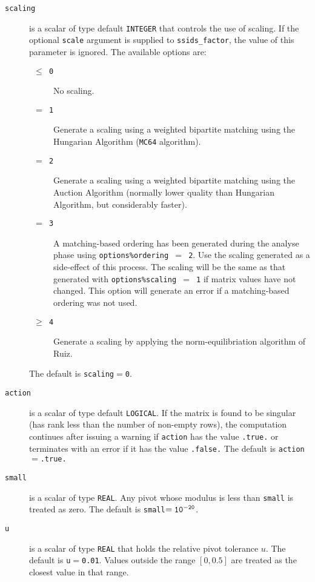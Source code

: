\documentclass{spral}
\begin{document}
\begin{description}
\item[\texttt{scaling}] is a scalar of type default {\tt INTEGER} that controls
the use of scaling. If the optional {\tt scale} argument is supplied to
{\tt ssids\_factor}, the value of this parameter is ignored. The available
options are:
\begin{description}
   \item[\texttt{ $\le$ 0 }] No scaling.
   \item[\texttt{ $=$ 1 }] Generate a scaling using a weighted bipartite matching using
      the Hungarian Algorithm (\texttt{MC64} algorithm).
   \item[\texttt{ $=$ 2 }] Generate a scaling using a weighted bipartite matching using
      the Auction Algorithm (normally lower quality than Hungarian Algorithm, but considerably faster).
   \item[\texttt{ $=$ 3 }] A matching-based ordering has been generated during the
      analyse phase using {\tt options\%ordering $=$ 2}. Use the
      scaling generated as a side-effect of this process. The scaling will be
      the same as that generated with {\tt options\%scaling $=$ 1} if matrix
      values have not changed. This option will generate an error if a
      matching-based ordering was not used.
   \item[\texttt{ $\ge$ 4 }] Generate a scaling by applying the norm-equilibriation
      algorithm of Ruiz.
\end{description}
The default is {\tt scaling}$=${\tt 0}.

\end{description}


\begin{description}
\item[\texttt{action}] is a scalar of type default {\tt LOGICAL}.
If the matrix is found to be singular (has rank less than the number of
non-empty rows), the computation continues after issuing a warning if
{\tt action} has the value {\tt .true.} or
terminates with an error if it has the value {\tt .false.}
The default is {\tt action}$=${\tt .true.}

\item[\texttt{small}] is a scalar of type {\tt REAL}.
Any pivot whose modulus is less than {\tt small} is treated as zero.
The default is {\tt small}$ = {\tt 10^{-20}}$.

\item[\texttt{u}] is a scalar of type {\tt REAL} that holds the relative pivot
tolerance $u$.
The default is {\tt u}$=${\tt 0.01}.
Values outside the range $[0,0.5]$ are treated as the closest value in that range.

\end{description}
\end{document}
